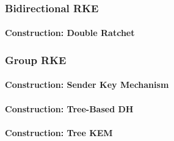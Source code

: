 \documentclass[a4paper,orivec]{llncs}
\begin{document}
\subsubsection{Bidirectional RKE}

\paragraph{Construction: Double Ratchet}

\subsubsection{Group RKE}

\paragraph{Construction: Sender Key Mechanism}

\paragraph{Construction: Tree-Based DH}

\paragraph{Construction: Tree KEM}


\end{document}
